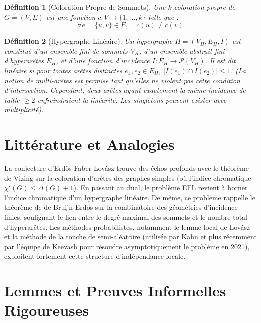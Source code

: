 \documentclass[12pt,a4paper]{article}
\newtheorem{definition}{Définition}
\begin{document}
\begin{definition}[Coloration Propre de Sommets]
Une $k$-coloration propre de $G = (V, E)$ est une fonction $c : V \to \{1, \dots, k\}$ telle que :
$$ \forall e = \{u, v\} \in E, \quad c(u) \neq c(v) $$
\end{definition}

\begin{definition}[Hypergraphe Linéaire]
Un hypergraphe $H = (V_H, E_H, I)$ est constitué d'un ensemble fini de sommets $V_H$, d'un ensemble abstrait fini d'hyperarêtes $E_H$, et d'une fonction d'incidence $I : E_H \to \mathcal{P}(V_H)$. Il est dit \emph{linéaire} si pour toutes arêtes distinctes $e_1, e_2 \in E_H$, $|I(e_1) \cap I(e_2)| \le 1$. (La notion de multi-arêtes est permise tant qu'elles ne violent pas cette condition d'intersection. Cependant, deux arêtes ayant exactement la même incidence de taille $\ge 2$ enfreindraient la linéarité. Les singletons peuvent exister avec multiplicité).
\end{definition}

\section{Littérature et Analogies}

La conjecture d'Erdős-Faber-Lovász trouve des échos profonds avec le théorème de Vizing sur la coloration d'arêtes des graphes simples (où l'indice chromatique $\chi'(G) \le \Delta(G) + 1$). En passant au dual, le problème EFL revient à borner l'indice chromatique d'un hypergraphe linéaire. De même, ce problème rappelle le théorème de de Bruijn-Erdős sur la combinatoire des géométries d'incidence finies, soulignant le lien entre le degré maximal des sommets et le nombre total d'hyperarêtes. Les méthodes probabilistes, notamment le lemme local de Lovász et la méthode de la touche de semi-aléatoire (utilisée par Kahn et plus récemment par l'équipe de Keevash pour résoudre asymptotiquement le problème en 2021), exploitent fortement cette structure d'indépendance locale.

\section{Lemmes et Preuves Informelles Rigoureuses}
\end{document}
